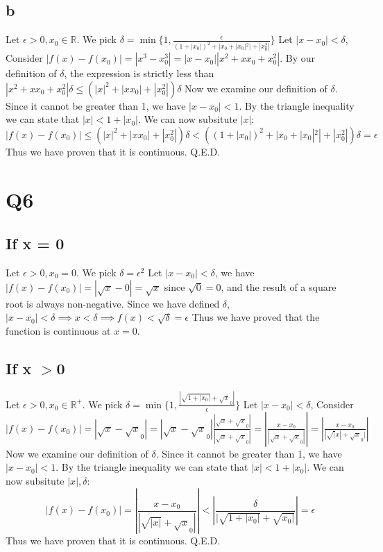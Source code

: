 \documentclass[12pt]{article}
\newcommand{\R}{\mathbb{R}}
\begin{document}
\subsection{b}
Let $\epsilon > 0, x_0 \in \R$. We pick $\delta = \min \{1, \frac{\epsilon}{(1+|x_0|)^2+|x_0+|x_0|^2|+|x_0^2|} \}$
\newline
Let $|x-x_0|<\delta$, Consider $|f(x)-f(x_0)| = |x^3-x_0^3| = |x-x_0||x^2+xx_0+x_0^2|$. By our definition of $\delta$, the expression is strictly less than $|x^2+xx_0+x_0^2|\delta \leq (|x|^2+|xx_0|+|x_0^2|)\delta$
\newline
Now we examine our definition of $\delta$. Since it cannot be greater than 1, we have $|x-x_0|<1$. By the triangle inequality we can state that $|x|< 1+|x_0|$.
\newline
We can now subsitute $|x|$:
$$|f(x)-f(x_0)| \leq (|x|^2+|xx_0|+|x_0^2|)\delta <((1+|x_0|)^2+|x_0+|x_0|^2|+|x_0^2|)\delta = \epsilon$$
Thus we have proven that it is continuous.
\newline
Q.E.D.
\newpage


\section{Q6}
\subsection{If x = 0}
Let $\epsilon > 0, x_0 = 0$. We pick $\delta = \epsilon^2$
\newline
Let $|x-x_0|<\delta$, we have $|f(x)-f(x_0)| = |\sqrt x - 0| = \sqrt x$ since $\sqrt 0 = 0$, and the result of a square root is always non-negative.
\newline
Since we have defined $\delta$, $|x-x_0|<\delta \implies x < \delta \implies f(x) < \sqrt \delta = \epsilon$
\newline
Thus we have proved that the function is continuous at $x=0$.

\subsection{If x $> $0}
Let $\epsilon > 0, x_0 \in \R^+$. We pick $\delta = \min \{1, \frac{|\sqrt{1+|x_0|} + \sqrt x_0|}{\epsilon}\}$
\newline
Let $|x-x_0|<\delta$, Consider $|f(x)-f(x_0)| = |\sqrt x - \sqrt x_0| = |\sqrt x - \sqrt x_0| \frac{|\sqrt x + \sqrt x_0|}{|\sqrt x + \sqrt x_0|} = |\frac{x-x_0}{|\sqrt x + \sqrt x_0|}| = |\frac{x-x_0}{|\sqrt |x| + \sqrt x_0|}|$
\newline
Now we examine our definition of $\delta$. Since it cannot be greater than 1, we have $|x-x_0|<1$. By the triangle inequality we can state that $|x|< 1+|x_0|$.
\newline
We can now subsitute $|x|, \delta$:
$$|f(x)-f(x_0)| = |\frac{x-x_0}{|\sqrt {|x|} + \sqrt x_0|}| <  |\frac{\delta}{|\sqrt{1+|x_0|} + \sqrt{x_0|}}|= \epsilon$$
Thus we have proven that it is continuous.
\newline
Q.E.D.
\newpage
\end{document}
